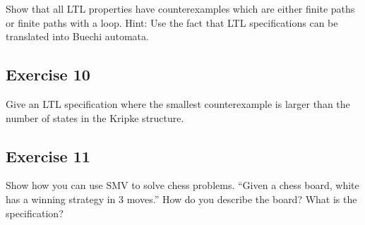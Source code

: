 \documentclass[a4paper, 12pt]{article}
\begin{document}
Show that all LTL properties have counterexamples which are either finite
paths or finite paths with a loop. Hint: Use the fact that LTL specifications
can be translated into Buechi automata.

\subsection{Exercise 10}

Give an LTL specification where the smallest counterexample is larger than the
number of states in the Kripke structure.

\subsection{Exercise 11}

Show how you can use SMV to solve chess problems. “Given a chess board, white
has a winning strategy in 3 moves.” How do you describe the board? What is
the specification?
\end{document}
